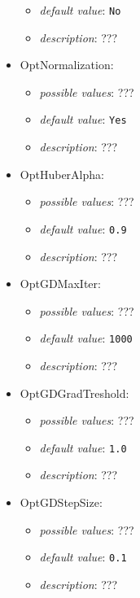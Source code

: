 \documentclass{article}
\begin{document}
\begin{itemize}
\begin{itemize}
                \item \emph{default value}: \texttt{No}
                \item \emph{description}: ???
           \end{itemize}
    \item OptNormalization:
           \begin{itemize}
                \item \emph{possible values}: ???
                \item \emph{default value}: \texttt{Yes}
                \item \emph{description}: ???
           \end{itemize}
    \item OptHuberAlpha:
           \begin{itemize}
                \item \emph{possible values}: ???
                \item \emph{default value}: \texttt{0.9}
                \item \emph{description}: ???
           \end{itemize}
    \item OptGDMaxIter:
           \begin{itemize}
                \item \emph{possible values}: ???
                \item \emph{default value}: \texttt{1000}
                \item \emph{description}: ???
           \end{itemize}
    \item OptGDGradTreshold:
           \begin{itemize}
                \item \emph{possible values}: ???
                \item \emph{default value}: \texttt{1.0}
                \item \emph{description}: ???
           \end{itemize}
    \item OptGDStepSize:
           \begin{itemize}
                \item \emph{possible values}: ???
                \item \emph{default value}: \texttt{0.1}
                \item \emph{description}: ???
           \end{itemize}

\end{itemize}
\end{document}
